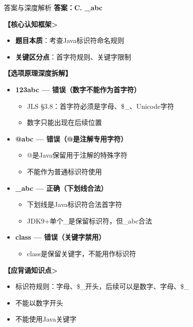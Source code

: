 \documentclass[12pt, a4paper]{ctexart}
\begin{document}
\begin{enumerate}[label=\textbf{\arabic*.}]
	      \begin{bluebox}{答案与深度解析}
		      \textbf{答案：C. \_abc}

		      \textbf{【核心认知框架>}
		      \begin{itemize}[label={}, leftmargin=*, nosep]
			      \item \textbf{题目本质}：考查Java标识符命名规则
			      \item \textbf{关键区分点}：首字符规则、关键字限制
		      \end{itemize}

		      \textbf{【选项原理深度拆解】}

		      \begin{itemize}[leftmargin=*, nosep, label={}]
			      \item[A] \textbf{123abc — 错误（数字不能作为首字符）}
			      \begin{itemize}[label={}, nosep]
				      \item JLS §3.8：首字符必须是字母、\$\_、Unicode字符
				      \item 数字只能出现在后续位置
			      \end{itemize}

			      \item[B] \textbf{@abc — 错误（@是注解专用字符）}
			      \begin{itemize}[label={}, nosep]
				      \item @是Java保留用于注解的特殊字符
				      \item 不能作为普通标识符使用
			      \end{itemize}

			      \item[C] \textbf{\_abc — 正确（下划线合法）}
			      \begin{itemize}[label={}, nosep]
				      \item 下划线是Java标识符合法首字符
				      \item JDK9+单个\_是保留标识符，但\_abc合法
			      \end{itemize}

			      \item[D] \textbf{class — 错误（关键字禁用）}
			      \begin{itemize}[label={}, nosep]
				      \item class是保留关键字，不能用作标识符
			      \end{itemize}
		      \end{itemize}

		      \textbf{【应背诵知识点>}
		      \begin{itemize}[label={}, nosep]
			      \item 标识符规则：字母、\$\_开头，后续可以是数字、字母、\$\_
			      \item 不能以数字开头
			      \item 不能使用Java关键字
		      \end{itemize}
	      \end{bluebox}


\end{enumerate}
\end{document}
